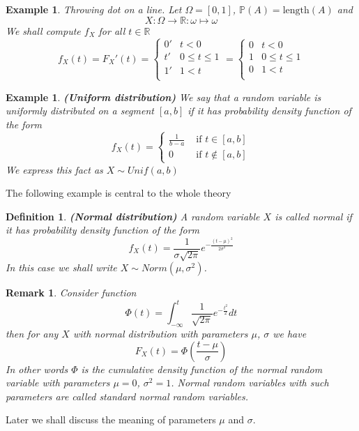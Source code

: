 \documentclass[12pt]{article}
\newtheorem{remark}[theorem]{Remark}
\newtheorem{definition}[theorem]{Definition}
\newtheorem{example}[theorem]{Example}
\begin{document}
\begin{example} Throwing dot on a line. Let $\Omega=[0,1]$, $\mathbb{P}(A)=\mbox{length}(A)$ and 
$$
X:\Omega\to\mathbb{R}:\omega\mapsto \omega
$$
We shall compute $f_X$ for all $t\in\mathbb{R}$
$$
f_X(t)=F_X'(t)
=\begin{cases}
0' & t < 0\\
t' & 0\leq t \leq 1\\
1' & 1 < t\\
\end{cases}
=\begin{cases}
0 & t < 0\\
1 & 0\leq t \leq 1\\
0 & 1 < t\\
\end{cases}
$$
\end{example}

\begin{example} \textbf{(Uniform distribution)} We say that a random variable is uniformly distributed on a segment $[a, b]$ if it has probability density function of the form
$$
f_X(t)
=\begin{cases}
\frac{1}{b-a} & \mbox{ if } t\in[a,b] \\
0 & \mbox{ if } t\notin[a,b]
\end{cases}
$$
We express this fact as $X\sim Unif(a, b)$
\end{example}

The following example is central to the whole theory

\begin{definition} \textbf{(Normal distribution)} A random variable $X$ is called normal if it has probability density function of the form
$$
f_X(t)=\frac{1}{\sigma\sqrt{2\pi}}e^{-\frac{(t-\mu)^2}{2\sigma^2}}
$$
In this case we shall write $X\sim Norm(\mu,\sigma^2)$.
\end{definition}

\begin{remark} Consider function
$$
\Phi(t)=\int_{-\infty}^t\frac{1}{\sqrt{2\pi}}e^{-\frac{t^2}{2}}dt
$$
then for any $X$ with normal distribution with parameters $\mu$, $\sigma$ we have
$$
F_X(t)=\Phi\left(\frac{t-\mu}{\sigma}\right)
$$
In other words $\Phi$ is the cumulative density function of the normal random variable with parameters $\mu=0$, $\sigma^2=1$. Normal random variables with such parameters are called standard normal random variables.
\end{remark}

Later we shall discuss the meaning of parameters $\mu$ and $\sigma$.
\end{document}
